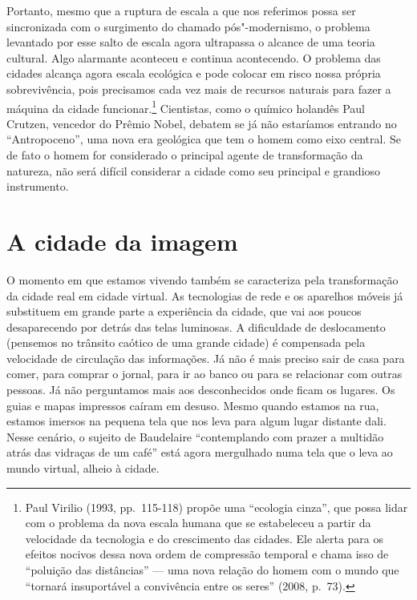 Portanto, mesmo que a ruptura de escala a que nos referimos possa ser
sincronizada com o surgimento do chamado pós"-modernismo, o problema
levantado por esse salto de escala agora ultrapassa o alcance de uma
teoria cultural. Algo alarmante aconteceu e continua acontecendo. O
problema das cidades alcança agora escala ecológica e pode colocar em
risco nossa própria sobrevivência, pois precisamos cada vez mais de
recursos naturais para fazer a máquina da cidade funcionar.\footnote{Paul
  Virilio (1993, pp.~115-118) propõe uma ``ecologia cinza'', que possa
  lidar com o problema da nova escala humana que se estabeleceu a partir
  da velocidade da tecnologia e do crescimento das cidades. Ele alerta
  para os efeitos nocivos dessa nova ordem de compressão temporal e
  chama isso de ``poluição das distâncias'' --- uma nova relação do homem
  com o mundo que ``tornará insuportável a convivência entre os seres''
  (2008, p.~73).} Cientistas, como o químico holandês Paul Crutzen,
vencedor do Prêmio Nobel, debatem se já não estaríamos entrando no
``Antropoceno'', uma nova era geológica que tem o homem como eixo
central. Se de fato o homem for considerado o principal agente de
transformação da natureza, não será difícil considerar a cidade como seu
principal e grandioso instrumento.

\chapter{A cidade da imagem}

O momento em que estamos vivendo também se caracteriza pela
transformação da cidade real em cidade virtual. As tecnologias de rede e
os aparelhos móveis já substituem em grande parte a experiência da
cidade, que vai aos poucos desaparecendo por detrás das telas luminosas.
A dificuldade de deslocamento (pensemos no trânsito caótico de uma
grande cidade) é compensada pela velocidade de circulação das
informações. Já não é mais preciso sair de casa para comer, para comprar
o jornal, para ir ao banco ou para se relacionar com outras pessoas. Já
não perguntamos mais aos desconhecidos onde ficam os lugares. Os guias e
mapas impressos caíram em desuso. Mesmo quando estamos na rua, estamos
imersos na pequena tela que nos leva para algum lugar distante dali.
Nesse cenário, o sujeito de Baudelaire ``contemplando com prazer a
multidão atrás das vidraças de um café'' está agora mergulhado numa tela
que o leva ao mundo virtual, alheio à cidade.

